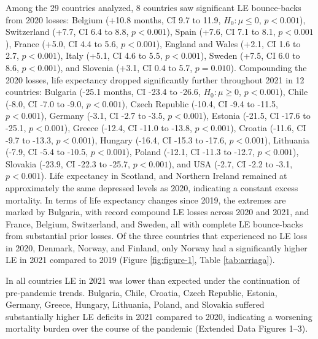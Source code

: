 \documentclass[12pt]{article}
\begin{document}
Among the 29 countries analyzed, 8 countries saw significant LE bounce-backs from 2020 losses:
Belgium (+10.8 months, CI 9.7 to 11.9, $H_0: \mu \leq 0$, $p< 0.001$),
Switzerland (+7.7, CI 6.4 to 8.8, $p< 0.001$),
Spain (+7.6, CI 7.1 to 8.1, $p< 0.001$),
France (+5.0, CI 4.4 to 5.6, $p< 0.001$),
England and Wales (+2.1, CI 1.6 to 2.7, $p< 0.001$),
Italy (+5.1, CI 4.6 to 5.5, $p< 0.001$),
Sweden (+7.5, CI 6.0 to 8.6, $p< 0.001$), and
Slovenia (+3.1, CI 0.4 to 5.7, $p=0.010$).
Compounding the 2020 losses, life expectancy dropped significantly further throughout 2021 in 12 countries:
Bulgaria (-25.1 months, CI -23.4 to -26.6, $H_0: \mu \geq 0$, $p< 0.001$),
Chile (-8.0, CI -7.0 to -9.0, $p< 0.001$),
Czech Republic (-10.4, CI -9.4 to -11.5, $p< 0.001$),
Germany (-3.1, CI -2.7 to -3.5, $p< 0.001$),
Estonia (-21.5, CI -17.6 to -25.1, $p< 0.001$),
Greece (-12.4, CI -11.0 to -13.8, $p< 0.001$),
Croatia (-11.6, CI -9.7 to -13.3, $p< 0.001$),
Hungary (-16.4, CI -15.3 to -17.6, $p< 0.001$),
Lithuania (-7.9, CI -5.4 to -10.5, $p< 0.001$),
Poland (-12.1, CI -11.3 to -12.7, $p< 0.001$),
Slovakia (-23.9, CI -22.3 to -25.7, $p < 0.001$), and
USA (-2.7, CI -2.2 to -3.1, $p< 0.001$).
Life expectancy in Scotland, and Northern Ireland remained at approximately the same depressed levels as 2020, indicating a constant excess mortality.
In terms of life expectancy changes since 2019, the extremes are marked by Bulgaria, with record compound LE losses across 2020 and 2021, and France, Belgium, Switzerland, and Sweden, all with complete LE bounce-backs from substantial prior losses. Of the three countries that experienced no LE loss in 2020, Denmark, Norway, and Finland, only Norway had a significantly higher LE in 2021 compared to 2019 (Figure \ref{fig:figure-1}, Table \ref{tab:arriaga}).

In all countries LE in 2021 was lower than expected under the continuation of pre-pandemic trends. Bulgaria, Chile, Croatia, Czech Republic, Estonia, Germany, Greece, Hungary, Lithuania, Poland, and Slovakia suffered substantially higher LE deficits in 2021 compared to 2020, indicating a worsening mortality burden over the course of the pandemic (Extended Data Figures 1--3).
\end{document}
